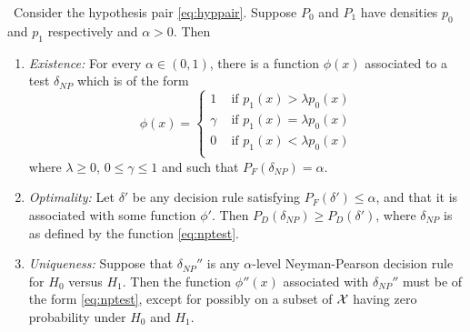 \begin{lemma}\
Consider the hypothesis pair \ref{eq:hyppair}. Suppose $P_0$ and $P_1$ have densities $p_0$ and $p_1$ respectively and $\alpha>0$. Then
\begin{enumerate}
\item \textit{Existence:} For every $\alpha \in (0,1)$, there is a function  $\phi(x)$ associated to a test $\delta_{NP}$ which is of the form 
\begin{equation}
\label{eq:nptest}
\phi(x)=\left\{ 
\begin{array}{ll}
1 & \mbox{ if } p_1(x) > \lambda p_0(x) \\
\gamma & \mbox{ if } p_1(x) = \lambda p_0(x) \\
0 & \mbox{ if } p_1(x) < \lambda p_0(x) \\
\end{array}
\right.
\end{equation}
where $\lambda \geq 0$, $0\leq \gamma \leq 1$ and such that $P_F(\delta_{NP})=\alpha$.
\item \textit{Optimality:} Let $\delta'$ be any decision rule satisfying $P_F(\delta')\leq \alpha$, and that it is associated with some function $\phi'$. Then $P_D(\delta_{NP}) \geq P_D(\delta')$, where $\delta_{NP}$ is as defined by the function \ref{eq:nptest}.
\item \textit{Uniqueness:} Suppose that $\delta_{NP}''$ is any $\alpha$-level Neyman-Pearson decision rule for $H_0$ versus $H_1$. Then the function $\phi''(x)$ associated with $\delta_{NP}''$ must be of the form \ref{eq:nptest}, except for possibly on a subset of $\mathcal{X}$ having zero probability under $H_0$ and $H_1$.
\end{enumerate}

\end{lemma}

